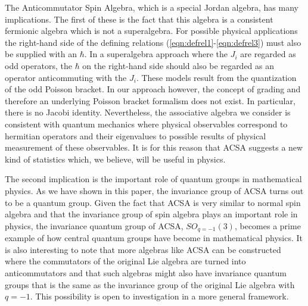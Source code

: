 The Anticommutator Spin Algebra, which is a special Jordan
algebra, has many implications. The first of these is the fact
that this algebra is a consistent fermionic algebra which is not a
superalgebra.
For possible physical applications the right-hand side of the
defining relations (\ref{eqn:defrel1}-\ref{eqn:defrel3}) must also
be supplied with an $\hbar$. In a superalgebra approach where the
$J_i$ are regarded as odd operators, the $\hbar$ on the right-hand
side should also be regarded as an operator anticommuting with the
$J_i$. These models \cite{leites,batalin} result from the
quantization of the odd Poisson bracket. In our approach however,
the concept of grading and therefore an underlying Poisson bracket
formalism does not exist. In particular, there is no Jacobi
identity. Nevertheless, the associative algebra we consider is
consistent with quantum mechanics where physical observables
correspond to hermitian operators and their eigenvalues to
possible results of physical measurement of these observables. It
is for this reason that ACSA suggests a new kind of statistics
which, we believe, will be useful in physics.

The second implication is the important role of quantum groups in
mathematical physics. As we have shown in this paper, the
invariance group of ACSA turns out to be a quantum group. Given
the fact that ACSA is very similar to normal spin algebra and that
the invariance group of spin algebra plays an important role in
physics, the invariance quantum group of ACSA, $SO_{q=-1}(3)$,
becomes a prime example of how central quantum groups have become
in mathematical physics. It is also interesting to note that more
algebras like ACSA can be constructed where the commutators of the
original Lie algebra are turned into anticommutators and that such
algebras might also have invariance quantum groups that is the
same as the invariance group of the original Lie algebra with
$q=-1$. This possibility is open to investigation in a more
general framework.
